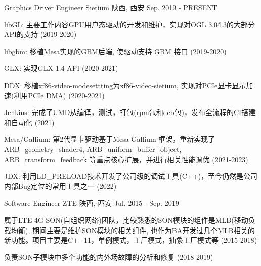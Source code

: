 
\begin{cventries}
  \cventry
    {Graphics Driver Engineer} %
    {Sietium} %
    {陕西, 西安} %
    {Sep. 2019 - PRESENT} %
    {
      \begin{cvitems} %
        \item {libGL: 主要工作内容GPU用户态驱动的开发和维护，实现对OGL 3.0\~4.3的大部分API的支持 (2019-2020)}
        \item {libgbm: 移植Mesa实现的GBM后端, 使驱动支持 GBM 接口 (2019-2020)}
        \item {GLX: 实现GLX 1.4 API (2020-2021)}
        \item {DDX: 移植xf86-video-modesettting为xf86-video-sietium, 实现对PCIe显卡显示加速(利用PCIe DMA) (2020-2021)}
        \item {Jenkins: 完成了UMD从编译，测试，打包(rpm包和deb包)，发布全流程的CI搭建和自动化 (2021)}
        \item {\hspace{0.5cm}}
        \item {Mesa/Gallium: 第2代显卡驱动基于Mesa Gallium 框架，重新实现了ARB\_geometry\_shader4,  ARB\_uniform\_buffer\_object, ARB\_transform\_feedback 等重点核心扩展，并进行相关性能调优 (2021-2023)}
        \item {JDX: 利用LD\_PRELOAD技术开发了公司级的调试工具(C++)，至今仍然是公司内部Bug定位的常用工具之一 (2022)}
      \end{cvitems}
    }

  \cventry
    {Software Engineer} %
    {ZTE} %
    {陕西, 西安} %
    {Jul. 2015 - Sep. 2019} %
    {
      \begin{cvitems} %
      \item {属于LTE 4G SON(自组织网络)团队，比较熟悉的SON模块的组件是MLB(移动负载均衡), 期间主要是维护SON模块的相关组件, 也作为BA开发过几个MLB相关的新功能。项目主要是C++11，单例模式，工厂模式，抽象工厂模式等 (2015-2018)}
      \item {负责SON子模块中多个功能的内外场故障的分析和修复 (2018-2019)}
      \end{cvitems}
    }
\end{cventries}
